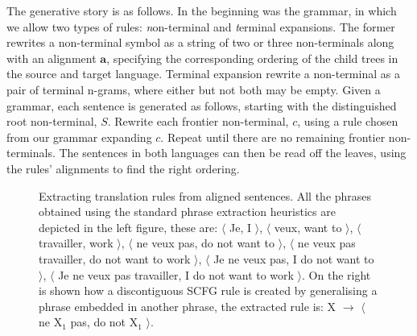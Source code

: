 The generative story is as follows. 
In the beginning was the grammar, in which we allow  two types of rules: {\emph non-terminal} and {\emph terminal} expansions. 
The former rewrites a non-terminal symbol as a string of two or three non-terminals along with an alignment $\mathbf{a}$, specifying the corresponding ordering of the child trees in the source and target language. 
Terminal expansion rewrite a non-terminal as a pair of terminal n-grams, where either but not both may be empty. 
Given a grammar, each sentence is generated as follows, starting with the distinguished root non-terminal, $S$. 
Rewrite each frontier non-terminal, $c$, using a rule chosen from our grammar expanding $c$. 
Repeat until there are no remaining frontier non-terminals. 
The sentences in both languages can then be read off the leaves, using the rules' alignments to find the right ordering. 

\begin{figure}[t]
  \centering
\caption{Extracting translation rules from aligned sentences. All the phrases obtained using the standard phrase extraction heuristics are depicted in the left figure, these are: $\langle$ Je, I $\rangle$, $\langle$ veux, want to $\rangle$, $\langle$ travailler, work $\rangle$, $\langle$ ne veux pas, do not want to $\rangle$, $\langle$ ne veux pas travailler, do not want to work $\rangle$, $\langle$ Je ne veux pas, I do not want to $\rangle$, $\langle$ Je ne veux pas travailler, I do not want to work $\rangle$. On the right is shown how a discontiguous SCFG rule is created by generalising a phrase embedded in another phrase, the extracted rule is: X $\rightarrow$ $\langle$ ne X$_1$ pas, do not X$_1$ $\rangle$.}
\label{fig:intro_rule_extraction}
\end{figure}

